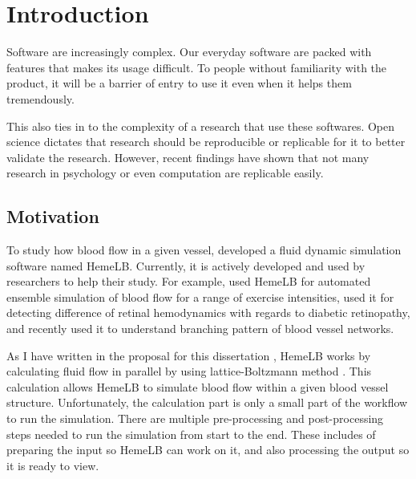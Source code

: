  

\chapter[Introduction]{Introduction}

Software are increasingly complex. Our everyday software are packed with features that makes its usage difficult. To people without familiarity with the product, it will be a barrier of entry to use it even when it helps them tremendously. 

This also ties in to the complexity of a research that use these softwares. Open science dictates that research should be reproducible or replicable for it to better validate the research. However, recent findings have shown that not many research in psychology or even computation are replicable easily.  


\section{Motivation}
To study how blood flow in a given vessel, \cite{mazzeo2008hemelb} developed a fluid dynamic simulation software named HemeLB. Currently, it is actively developed and used by researchers to help their study. For example, \cite{itani2015automated} used HemeLB for automated ensemble simulation of blood flow for a range of exercise intensities,  \cite{bernabeu2015characterization} used it for detecting difference of retinal hemodynamics with regards to diabetic retinopathy, and recently \cite{franco2015dynamic,franco2016non} used it to understand branching pattern of blood vessel networks.

As I have written in the proposal for this dissertation \citep{Steven:2016aa}, HemeLB works by calculating fluid flow in parallel by using lattice-Boltzmann method \citep{mazzeo2008hemelb}. This calculation allows HemeLB to simulate blood flow within a given blood vessel structure. Unfortunately, the calculation part is only a small part of the workflow to run the simulation. There are multiple pre-processing and post-processing steps needed to run the simulation from start to the end. These includes of preparing the input so HemeLB can work on it, and also processing the output so it is ready to view.

